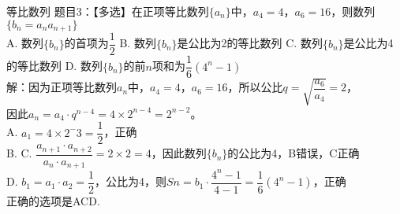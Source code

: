 \documentclass[aspectratio=169]{ctexbeamer} %
\date{\today}
\begin{document}
\begin{frame}[t]{等比数列}
题目3：【多选】在正项等比数列$\{a_n\}$中，$a_4 = 4$，$a_6 = 16$，则数列$\{ b_n = a_na_{n+1} \}$ \\
A. 数列$\{ b_n \}$的首项为$\dfrac{1}{2}$  \hspace{2em} B. 数列$\{ b_n \}$是公比为2的等比数列   \hspace{2em} C. 数列$\{ b_n \}$是公比为4的等比数列 \hspace{2em} D. 数列$\{ b_n \}$的前$n$项和为$\dfrac{1}{6}(4^n-1)$ \\
\vspace{0.5cm}
\pause
解：因为正项等比数列$a_n$中，$a_4 = 4$，$a_6 = 16$，所以公比$q = \sqrt{\dfrac{a_6}{a_4}} = 2$，\\
\pause
因此$a_n = a_4 \cdot q^{n-4} = 4 \times 2^{n-4} = 2^{n-2}$。\\
\pause
A. $a_1 = 4 \times 2^-3 = \dfrac{1}{2}$，正确 \\
\pause
B. C. $\dfrac{a_{n+1} \cdot a_{n+2}}{a_{n} \cdot a_{n+1}} = 2 \times 2 = 4$，因此数列$\{b_n\}$的公比为4，B错误，C正确 \\
\pause
D. $b_1 = a_1 \cdot a_2 = \dfrac{1}{2}$，公比为4，则$Sn = b_1 \cdot \dfrac{4^n - 1}{4-1} = \dfrac{1}{6}(4^n-1)$，正确 \\
\pause
正确的选项是ACD.
\end{frame}
\end{document}
